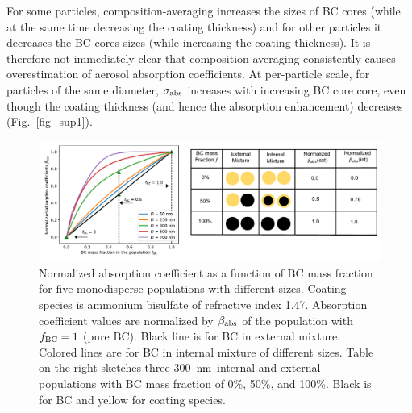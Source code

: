 \documentclass[edeposit,fullpage]{uiucthesis2009}
\makeatletter
\DeclareRobustCommand*\unit[1]
 {\ensuremath{%
   {\thinmuskip3mu\relax
    \def\mu{\text{\textmu}}\def~{\,}%
    \ifx\f@series\testbx\mathbf{#1}\else\mathrm{#1}\fi}}}
\makeatother
\begin{document}
For some particles, composition-averaging increases the sizes of BC
cores (while at the same time decreasing the coating thickness) and
for other particles it decreases the BC cores sizes (while increasing
the coating thickness). It is therefore not immediately clear that
composition-averaging consistently causes overestimation of aerosol
absorption coefficients. At per-particle scale, 
for particles of the same diameter, 
$\sigma_{\rm abs}$ increases with increasing BC core core, even though
the coating thickness (and hence the absorption enhancement) decreases (Fig.~\ref{fig_sup1}).


\begin{figure}
	\centering
	\includegraphics[scale=0.6]{chap4_figs/fig5.pdf}
	\caption{Normalized absorption coefficient as a function of BC mass fraction for five
        monodisperse populations with different sizes. Coating species is ammonium bisulfate of refractive index 1.47.
        Absorption coefficient values are
        normalized by $\beta_{\rm abs}$ of the population with $f_{\rm
          BC} = 1$ (pure BC). Black line is for BC in external
        mixture. Colored lines are for BC in internal mixture of different sizes. Table on the right
        sketches three 300~\unit{nm} internal and external populations 
        with BC mass fraction of 0\%, 50\%, and 100\%. Black is for BC and yellow for coating species.}
	\label{fig5:abs-exp}
\end{figure}
\end{document}
